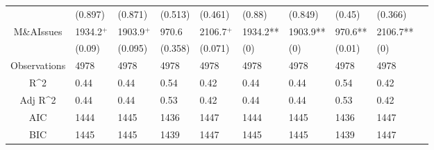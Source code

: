 \documentclass{article}
\begin{document}
\begin{table}[H]
\begin{tabular}{|clllllllll|}
   & (0.897) & (0.871) & (0.513) & (0.461) & (0.88) & (0.849) & (0.45) & (0.366) & \\ 
  M\&AIssues & 1934.2$^{+}$ & 1903.9$^{+}$ & 970.6 & 2106.7$^{+}$ & 1934.2** & 1903.9** & 970.6** & 2106.7** & \\ 
   & (0.09) & (0.095) & (0.358) & (0.071) & (0) & (0) & (0.01) & (0) & \\ 
  \hline 
 Observations & 4978 & 4978 & 4978 & 4978 & 4978 & 4978 & 4978 & 4978 & \\ 
  R^2 & 0.44 & 0.44 & 0.54 & 0.42 & 0.44 & 0.44 & 0.54 & 0.42 & \\ 
  Adj R^2 & 0.44 & 0.44 & 0.53 & 0.42 & 0.44 & 0.44 & 0.53 & 0.42 & \\ 
  AIC & 1444 & 1445 & 1436 & 1447 & 1444 & 1445 & 1436 & 1447 & \\ 
  BIC & 1445 & 1445 & 1439 & 1447 & 1445 & 1445 & 1439 & 1447 & \\ 
   \hline
\end{tabular}
 
\end{table}
\end{document}
